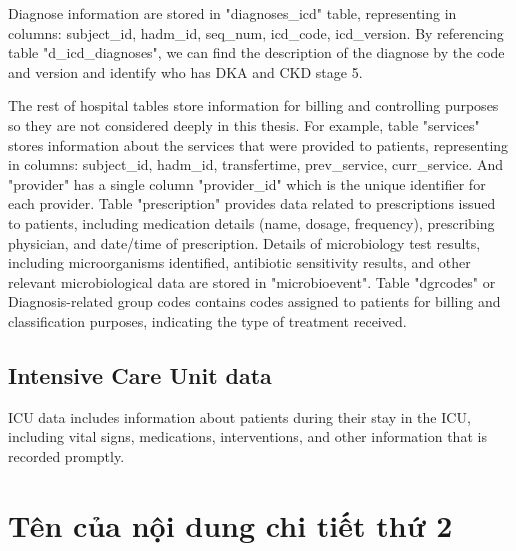 \documentclass[../main.tex]{subfiles}
\begin{document}
Diagnose information are stored in "diagnoses\_icd" table, representing in columns: subject\_id, hadm\_id, seq\_num, icd\_code, icd\_version. 
By referencing table "d\_icd\_diagnoses", we can find the description of the diagnose by the code and version and identify who has DKA and CKD stage 5.



The rest of hospital tables store information for billing and controlling purposes so they are not considered deeply in this thesis. 
For example, table "services" stores information about the services that were provided to patients, representing in columns: subject\_id, hadm\_id, transfertime, prev\_service, curr\_service. 
And "provider" has a single column "provider\_id" which is the unique identifier for each provider.
Table "prescription" provides data related to prescriptions issued to patients, including medication details (name, dosage, frequency), prescribing physician, and date/time of prescription.
Details of microbiology test results, including microorganisms identified, antibiotic sensitivity results, and other relevant microbiological data are stored in "microbioevent".
Table "dgrcodes" or Diagnosis-related group codes contains codes assigned to patients for billing and classification purposes, indicating the type of treatment received.






\subsection{Intensive Care Unit data}

ICU data includes information about patients during their stay in the ICU, including vital signs, medications, interventions, and other information that is recorded promptly.



\section{Tên của nội dung chi tiết thứ 2}
\end{document}
